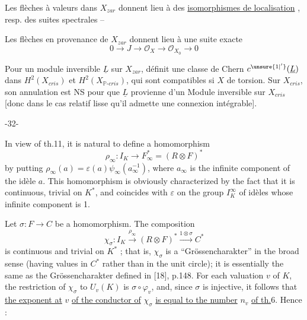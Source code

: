 
Les flèches à valeurs dans $X_{zar}$ donnent lieu à des \uline{isomorphismes de localisation} \uline{}, resp. des suites spectrales  --


Les flèches en provenance de $X_{zar}$ donnent lieu à une suite exacte
\[
0\longrightarrow J\longrightarrow\mathcal{O}_{X}\longrightarrow\mathcal{O}_{X_0}\longrightarrow0
\]

Pour un module inversible $\underline{L}$ sur $X_{zar}$,  définit une classe de Chern $c^{\unsure{1|'}}(\underline{L})$ dans $H^2(X_{cris})$ et $H^2(X_{\mathbb{P}\text{-}cris})$, qui sont compatibles si $X$ de torsion. Sur $X_{cris}$, son annulation est NS pour que $\underline{L}$ provienne d'un Module inversible sur $X_{cris}$ [donc dans le cas relatif lisse  qu'il admette une connexion intégrable].


-32-

In view of th.11, it is natural to define a homomorphism
\[
\rho_\infty:I_K\longrightarrow F_\infty^*=(R\otimes F)^*
\]
by putting $\rho_\infty(a)=\varepsilon(a)\psi_\infty(a_\infty^{-1})$, where $a_\infty$ is the infinite component of the idèle $a$. This homomorphism is obviously characterized by the fact that it is continuous, trivial on $K^*$, and coincides with $\varepsilon$ on the group $I_K^\infty$ of idèles whose infinite component is 1.

Let $\sigma:F\to C$ be a homomorphism. The composition
\[
\chi_\sigma:I_K\xrightarrow{\rho_\infty}(R\otimes F)^*\xrightarrow{1\otimes\sigma}C^*
\]
is continuous and trivial on $K^*$ ; that is, $\chi_\sigma$ is a ``Grössencharakter'' in the broad sense (having values in $C^*$ rather than in the unit circle); it is essentially the same as the Grössencharakter defined in [18], p.148. For each valuation $v$ of $K$, the restriction of $\chi_\sigma$ to $U_v(K)$ is $\sigma\circ\varphi_v$, and, since $\sigma$ is injective, it follows that \uline{the exponent at} $v$ \uline{of the conductor of} $\chi_\sigma$ \uline{is equal to the number} $n_v$ \uline{of th.}6. Hence :

